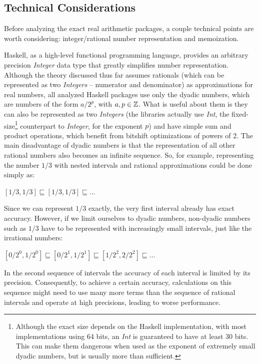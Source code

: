 \subsection{Technical Considerations}
\label{sec:technical_considerations}

Before analyzing the exact real arithmetic packages, a couple technical points are worth considering: integer/rational number representation and memoization.

Haskell, as a high-level functional programming language, provides an arbitrary precision \textit{Integer} data type that greatly simplifies number representation. Although the theory discussed thus far assumes rationals (which can be represented as two \textit{Integers} -- numerator and denominator) as approximations for real numbers, all analyzed Haskell packages use only the dyadic numbers, which are numbers of the form $a/2^p$, with $a, p \in \mathbb{Z}$. What is useful about them is they can also be represented as two \textit{Integers} (the libraries actually use \textit{Int}, the fixed-size\footnote{Although the exact size depends on the Haskell implementation, with most implementations using 64 bits, an \textit{Int} is guaranteed to have at least 30 bits. This can make them dangerous when used as the exponent of extremely small dyadic numbers, but is usually more than sufficient.} counterpart to \textit{Integer}, for the exponent $p$) and have simple sum and product operations, which benefit from bitshift optimizations of powers of 2. The main disadvantage of dyadic numbers is that the representation of all other rational numbers also becomes an infinite sequence. So, for example, representing the number $1/3$ with nested intervals and rational approximations could be done simply as:

$[1/3, 1/3] \sqsubseteq [1/3, 1/3] \sqsubseteq \dots$

Since we can represent $1/3$ exactly, the very first interval already has exact accuracy. However, if we limit ourselves to dyadic numbers, non-dyadic numbers such as $1/3$ have to be represented with increasingly small intervals, just like the irrational numbers:

$[0/2^0, 1/2^0] \sqsubseteq [0/2^1, 1/2^1] \sqsubseteq [1/2^2, 2/2^2] \sqsubseteq \dots$

In the second sequence of intervals the accuracy of each interval is limited by its precision. Consequently, to achieve a certain accuracy, calculations on this sequence might need to use many more terms than the sequence of rational intervals and operate at high precisions, leading to worse performance.

